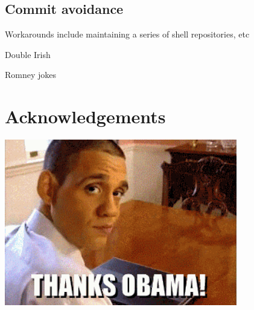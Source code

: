 \documentclass[10pt]{article}
\begin{document}
\subsection{Commit avoidance}

Workarounds include maintaining a series of shell repositories, etc

Double Irish

Romney jokes

\pagebreak
\section*{Acknowledgements}
\includegraphics[width=4in]{thanks.png}

%
\end{document}
